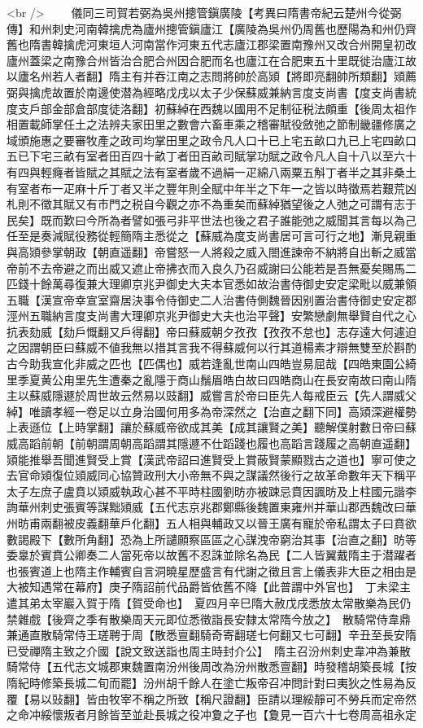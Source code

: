 <br />
　　儀同三司賀若弼為吳州摠管鎭廣陵【考異曰隋書帝紀云楚州今從弼傳】和州刺史河南韓擒虎為廬州摠管鎭廬江【廣陵為吳州仍周舊也歷陽為和州仍齊舊也隋書韓擒虎河東垣人河南當作河東五代志廬江郡梁置南豫州又改合州開皇初改廬州蓋梁之南豫合州皆治合肥合州因合肥而名也廬江在合肥東五十里既徙治廬江故以廬名州若人者翻】隋主有并吞江南之志問將帥於高熲【將即亮翻帥所類翻】熲薦弼與擒虎故置於南邊使潜為經略戊戌以太子少保蘇威兼納言度支尚書【度支尚書統度支戶部金部倉部度徒洛翻】初蘇綽在西魏以國用不足制征税法頗重【後周太祖作相置載師掌任土之法辨夫家田里之數會六畜車乘之稽審賦役斂弛之節制畿疆修廣之域頒施惠之要審牧產之政司均掌田里之政令凡人口十已上宅五畝口九已上宅四畝口五已下宅三畝有室者田百四十畝丁者田百畝司賦掌功賦之政令凡人自十八以至六十有四與輕癃者皆賦之其賦之法有室者歲不過絹一疋綿八兩粟五斛丁者半之其非桑土有室者布一疋麻十斤丁者又半之豐年則全賦中年半之下年一之皆以時徵焉若艱荒凶札則不徵其賦又有市門之税自今觀之亦不為重矣而蘇綽猶望後之人弛之可謂有志于民矣】既而歎曰今所為者譬如張弓非平世法也後之君子誰能弛之威聞其言每以為己任至是奏減賦役務從輕簡隋主悉從之【蘇威為度支尚書居可言可行之地】漸見親重與高熲參掌朝政【朝直遥翻】帝嘗怒一人將殺之威入閤進諫帝不納將自出斬之威當帝前不去帝避之而出威又遮止帝拂衣而入良久乃召威謝曰公能若是吾無憂矣賜馬二匹錢十餘萬尋復兼大理卿京兆尹御史大夫本官悉如故治書侍御史安定梁毗以威兼領五職【漢宣帝幸宣室齋居決事令侍御史二人治書侍側魏晉因别置治書侍御史安定郡涇州五職納言度支尚書大理卿京兆尹御史大夫也治平聲】安繁戀劇無舉賢自代之心抗表劾威【劾戶慨翻又戶得翻】帝曰蘇威朝夕孜孜【孜孜不怠也】志存遠大何遽迫之因謂朝臣曰蘇威不値我無以措其言我不得蘇威何以行其道楊素才辯無雙至於斟酌古今助我宣化非威之匹也【匹偶也】威若逢亂世南山四皓豈易屈哉【四皓東園公綺里季夏黄公甪里先生遭秦之亂隱于商山鬚眉皓白故曰四皓商山在長安南故曰南山隋主以蘇威隱遯於周世故云然易以豉翻】威嘗言於帝曰臣先人每戒臣云【先人謂威父綽】唯讀孝經一卷足以立身治國何用多為帝深然之【治直之翻下同】高熲深避權勢上表遜位【上時掌翻】讓於蘇威帝欲成其美【成其讓賢之美】聽解僕射數日帝曰蘇威高蹈前朝【前朝謂周朝高蹈謂其隱遯不仕蹈踐也履也高蹈言踐履之高朝直遥翻】熲能推舉吾聞進賢受上賞【漢武帝詔曰進賢受上賞蔽賢蒙顯戮古之道也】寧可使之去官命熲復位熲威同心協贊政刑大小帝無不與之謀議然後行之故革命數年天下稱平太子左庶子盧賁以熲威執政心甚不平時柱國劉昉亦被踈忌賁因諷昉及上柱國元諧李詢華州刺史張賓等謀黜熲威【五代志京兆郡鄭縣後魏置東雍州并華山郡西魏改曰華州昉甫兩翻被皮義翻華戶化翻】五人相與輔政又以晉王廣有寵於帝私謂太子曰賁欲數謁殿下【數所角翻】恐為上所譴願察區區之心謀洩帝窮治其事【治直之翻】昉等委辠於賓賁公卿奏二人當死帝以故舊不忍誅並除名為民【二人皆翼戴隋主于潜躍者也張賓道上也隋主作輔賓自言洞曉星歷盛言有代謝之徵且言上儀表非大臣之相由是大被知遇常在幕府】庚子隋詔前代品爵皆依舊不降【此普謂中外官也】　丁未梁主遣其弟太宰巖入賀于隋【賀受命也】　夏四月辛巳隋大赦戊戌悉放太常散樂為民仍禁雜戲【後齊之季有散樂周天元即位悉徵詣長安隸太常隋今放之】　散騎常侍韋鼎兼通直散騎常侍王瑳聘于周【散悉亶翻騎奇寄翻瑳七何翻又七可翻】辛丑至長安隋已受禪隋主致之介國【說文致送詣也周主時封介公】　隋主召汾州刺史韋冲為兼散騎常侍【五代志文城郡東魏置南汾州後周改為汾州散悉亶翻】時發稽胡築長城【按隋紀時修築長城二旬而罷】汾州胡千餘人在塗亡叛帝召冲問計對曰夷狄之性易為反覆【易以䜴翻】皆由牧宰不稱之所致【稱尺證翻】臣請以理綏靜可不勞兵而定帝然之命冲綏懷叛者月餘皆至並赴長城之役冲夐之子也【夐見一百六十七卷周高祖永定